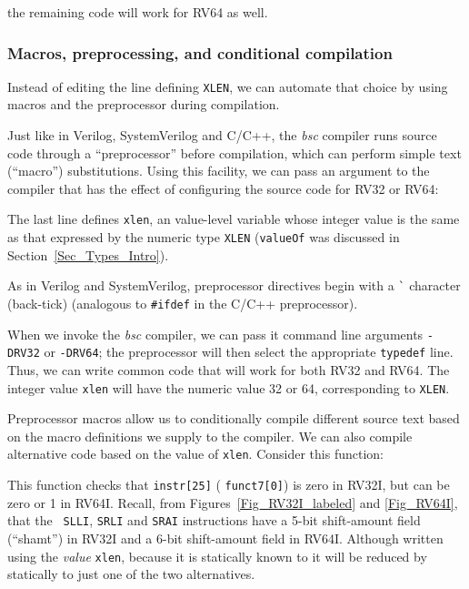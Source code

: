 the remaining code will work for RV64 as well.


\subsubsection{Macros, preprocessing, and conditional compilation}

\label{BSV_Conditional_compilation}


Instead of editing the line defining {\tt XLEN}, we can automate that
choice by using macros and the preprocessor during compilation.

Just like in Verilog, SystemVerilog and C/C++, the \emph{bsc} compiler
runs {\BSV} source code through a ``preprocessor'' before compilation,
which can perform simple text (``macro'') substitutions.  Using this
facility, we can pass an argument to the compiler that has the effect
of configuring the source code for RV32 or RV64:


The last line defines \verb|xlen|, an value-level variable whose
integer value is the same as that expressed by the numeric type
\verb|XLEN| ({\tt valueOf} was discussed in
Section~\ref{Sec_Types_Intro}).

As in Verilog and SystemVerilog, preprocessor directives begin with a
\verb|`| character (back-tick) (analogous to \verb|#ifdef| in the
C/C++ preprocessor).

When we invoke the \emph{bsc} compiler, we can pass it command line
arguments \verb|-DRV32| or \verb|-DRV64|; the preprocessor will then
select the appropriate \verb|typedef| line.  Thus, we can write common
code that will work for both RV32 and RV64.  The integer value
\verb|xlen| will have the numeric value 32 or 64, corresponding to
{\tt XLEN}.

Preprocessor macros allow us to conditionally compile different source
text based on the macro definitions we supply to the compiler.  We can
also compile alternative code based on the value of \verb|xlen|.
Consider this function:


This function checks that \verb|instr[25]| ({\ie} {\tt funct7[0]}) is
zero in RV32I, but can be zero or 1 in RV64I.  Recall, from
Figures~\ref{Fig_RV32I_labeled} and \ref{Fig_RV64I}, that the {\tt
SLLI}, {\tt SRLI} and {\tt SRAI} instructions have a 5-bit
shift-amount field (``shamt'') in RV32I and a 6-bit shift-amount field
in RV64I.  Although written using the \emph{value} {\tt xlen}, because
it is statically known to {\bsc} it will be reduced by {\bsc}
statically to just one of the two alternatives.

